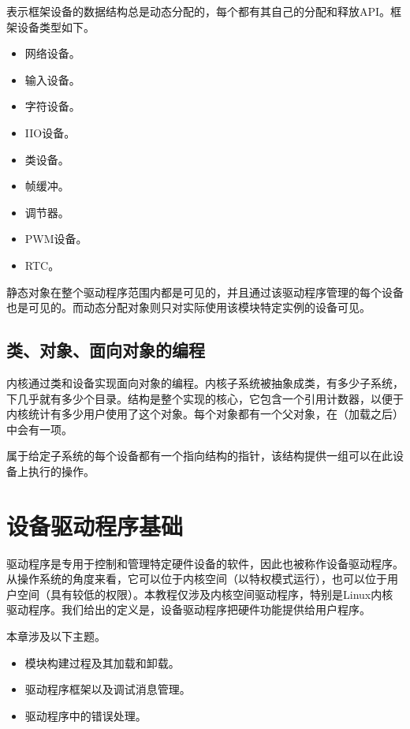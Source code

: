 \documentclass[lang=cn,newtx,10pt,scheme=chinese]{elegantbook}
\begin{document}
表示框架设备的数据结构总是动态分配的，每个都有其自己的分配和释放API。框架设备类型如下。

\begin{itemize}
\item 网络设备。
\item 输入设备。
\item 字符设备。
\item IIO设备。
\item 类设备。
\item 帧缓冲。
\item 调节器。
\item PWM设备。
\item RTC。
\end{itemize}

静态对象在整个驱动程序范围内都是可见的，并且通过该驱动程序管理的每个设备也是可见的。而动态分配对象则只对实际使用该模块特定实例的设备可见。

\section{类、对象、面向对象的编程}

内核通过类和设备实现面向对象的编程。内核子系统被抽象成类，有多少子系统，下几乎就有多少个目录。结构是整个实现的核心，它包含一个引用计数器，以便于内核统计有多少用户使用了这个对象。每个对象都有一个父对象，在（加载之后）中会有一项。

属于给定子系统的每个设备都有一个指向结构的指针，该结构提供一组可以在此设备上执行的操作。

\chapter{设备驱动程序基础}

驱动程序是专用于控制和管理特定硬件设备的软件，因此也被称作设备驱动程序。从操作系统的角度来看，它可以位于内核空间（以特权模式运行），也可以位于用户空间（具有较低的权限）。本教程仅涉及内核空间驱动程序，特别是Linux内核驱动程序。我们给出的定义是，设备驱动程序把硬件功能提供给用户程序。

本章涉及以下主题。

\begin{itemize}
\item 模块构建过程及其加载和卸载。
\item 驱动程序框架以及调试消息管理。
\item 驱动程序中的错误处理。
\end{itemize}
\end{document}
